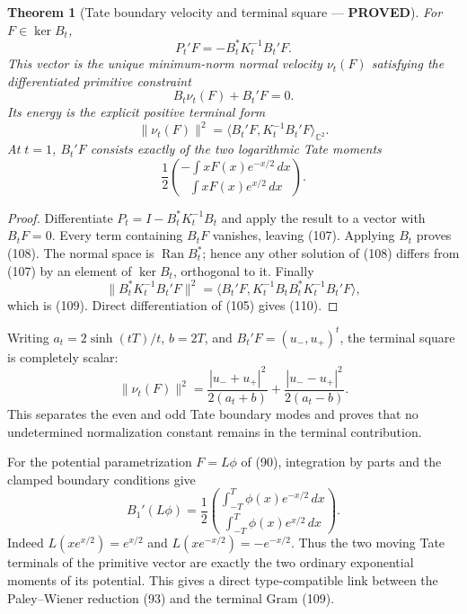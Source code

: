 \documentclass[11pt]{article}
\newtheorem{theorem}{Theorem}
\newcommand{\PROVED}{\textcolor{green!45!black}{\textbf{PROVED}}}
\newcommand{\Ran}{\operatorname{Ran}}
\begin{document}
\begin{theorem}[Tate boundary velocity and terminal square --- \PROVED]
For $F\in\ker B_t$,
\begin{equation}
 P_t'F=-B_t^*K_t^{-1}B_t'F.                            \tag{107}
\end{equation}
This vector is the unique minimum-norm normal velocity $\nu_t(F)$ satisfying
the differentiated primitive constraint
\begin{equation}
 B_t\nu_t(F)+B_t'F=0.                                  \tag{108}
\end{equation}
Its energy is the explicit positive terminal form
\begin{equation}
 \boxed{
 \|\nu_t(F)\|^2
 =\langle B_t'F,K_t^{-1}B_t'F\rangle_{\mathbb C^2}.}   \tag{109}
\end{equation}
At $t=1$, $B_t'F$ consists exactly of the two logarithmic Tate moments
\begin{equation}
 \frac12\binom{-\int xF(x)e^{-x/2}\,dx}
                    {\int xF(x)e^{x/2}\,dx}.           \tag{110}
\end{equation}
\end{theorem}

\begin{proof}
Differentiate $P_t=I-B_t^*K_t^{-1}B_t$ and apply the result to a vector with
$B_tF=0$.  Every term containing $B_tF$ vanishes, leaving (107).  Applying
$B_t$ proves (108).  The normal space is $\Ran B_t^*$; hence any other
solution of (108) differs from (107) by an element of $\ker B_t$, orthogonal
to it.  Finally
\[
 \|B_t^*K_t^{-1}B_t'F\|^2
 =\langle B_t'F,K_t^{-1}B_tB_t^*K_t^{-1}B_t'F\rangle,
\]
which is (109).  Direct differentiation of (105) gives (110).
\end{proof}

Writing $a_t=2\sinh(tT)/t$, $b=2T$, and
$B_t'F=(u_-,u_+)^t$, the terminal square is completely scalar:
\begin{equation}
 \|\nu_t(F)\|^2
 =\frac{|u_-+u_+|^2}{2(a_t+b)}
  +\frac{|u_--u_+|^2}{2(a_t-b)}.                       \tag{111}
\end{equation}
This separates the even and odd Tate boundary modes and proves that no
undetermined normalization constant remains in the terminal contribution.

For the potential parametrization $F=L\phi$ of (90), integration by parts
and the clamped boundary conditions give
\begin{equation}
 \boxed{
 B_1'(L\phi)=\frac12
 \binom{\displaystyle\int_{-T}^T\phi(x)e^{-x/2}\,dx}
       {\displaystyle\int_{-T}^T\phi(x)e^{x/2}\,dx}.} \tag{111a}
\end{equation}
Indeed
$L(xe^{x/2})=e^{x/2}$ and
$L(xe^{-x/2})=-e^{-x/2}$.  Thus the two moving Tate terminals of the
primitive vector are exactly the two ordinary exponential moments of its
potential.  This gives a direct type-compatible link between the
Paley--Wiener reduction (93) and the terminal Gram (109).
\end{document}
